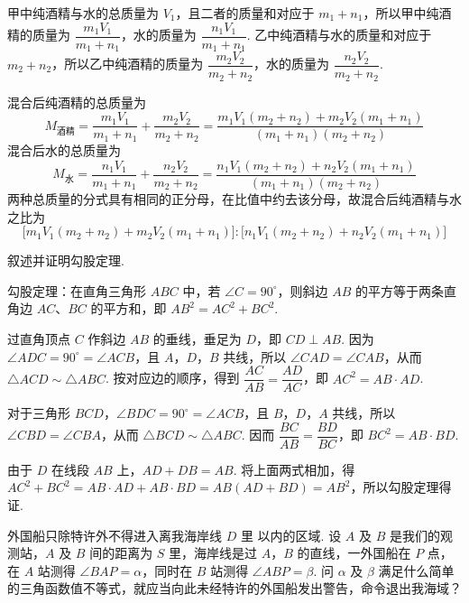\documentclass[UTF8,a4paper,oneside,11pt]{ctexbook}
\begin{document}
\begin{solution}
甲中纯酒精与水的总质量为 \(V_{1}\)，且二者的质量和对应于 \(m_{1}+n_{1}\)，所以甲中纯酒精的质量为 \(\dfrac{m_{1}V_{1}}{m_{1}+n_{1}}\)，水的质量为 \(\dfrac{n_{1}V_{1}}{m_{1}+n_{1}}\). 乙中纯酒精与水的质量和对应于 \(m_{2}+n_{2}\)，所以乙中纯酒精的质量为 \(\dfrac{m_{2}V_{2}}{m_{2}+n_{2}}\)，水的质量为 \(\dfrac{n_{2}V_{2}}{m_{2}+n_{2}}\).

混合后纯酒精的总质量为
\[
M_{\text{酒精}}=\frac{m_{1}V_{1}}{m_{1}+n_{1}}+\frac{m_{2}V_{2}}{m_{2}+n_{2}}=\frac{m_{1}V_{1}(m_{2}+n_{2})+m_{2}V_{2}(m_{1}+n_{1})}{(m_{1}+n_{1})(m_{2}+n_{2})}
\]
混合后水的总质量为
\[
M_{\text{水}}=\frac{n_{1}V_{1}}{m_{1}+n_{1}}+\frac{n_{2}V_{2}}{m_{2}+n_{2}}=\frac{n_{1}V_{1}(m_{2}+n_{2})+n_{2}V_{2}(m_{1}+n_{1})}{(m_{1}+n_{1})(m_{2}+n_{2})}
\]
两种总质量的分式具有相同的正分母，在比值中约去该分母，故混合后纯酒精与水之比为
\[
\bigl[m_{1}V_{1}(m_{2}+n_{2})+m_{2}V_{2}(m_{1}+n_{1})\bigr]:\bigl[n_{1}V_{1}(m_{2}+n_{2})+n_{2}V_{2}(m_{1}+n_{1})\bigr]
\]
\end{solution}

\begin{problem}
叙述并证明勾股定理.
\end{problem}

\begin{solution}
勾股定理：在直角三角形 \(ABC\) 中，若 \(\angle C=90^\circ\)，则斜边 \(AB\) 的平方等于两条直角边 \(AC\)、\(BC\) 的平方和，即 \(AB^2=AC^2+BC^2\).

过直角顶点 \(C\) 作斜边 \(AB\) 的垂线，垂足为 \(D\)，即 \(CD\perp AB\). 因为 \(\angle ADC=90^\circ=\angle ACB\)，且 \(A\)，\(D\)，\(B\) 共线，所以 \(\angle CAD=\angle CAB\)，从而 \(\triangle ACD\sim\triangle ABC\). 按对应边的顺序，得到 \(\dfrac{AC}{AB}=\dfrac{AD}{AC}\)，即 \(AC^2=AB\cdot AD\).

对于三角形 \(BCD\)，\(\angle BDC=90^\circ=\angle ACB\)，且 \(B\)，\(D\)，\(A\) 共线，所以 \(\angle CBD=\angle CBA\)，从而 \(\triangle BCD\sim\triangle ABC\). 因而 \(\dfrac{BC}{AB}=\dfrac{BD}{BC}\)，即 \(BC^2=AB\cdot BD\).

由于 \(D\) 在线段 \(AB\) 上，\(AD+DB=AB\). 将上面两式相加，得 \(AC^2+BC^2=AB\cdot AD+AB\cdot BD=AB(AD+BD)=AB^2\)，所以勾股定理得证.
\end{solution}

\begin{problem}
外国船只除特许外不得进入离我海岸线 \(D\text{ 里}\) 以内的区域. 设 \(A\) 及 \(B\) 是我们的观测站，\(A\) 及 \(B\) 间的距离为 \(S\text{ 里}\)，海岸线是过 \(A\)，\(B\) 的直线，一外国船在 \(P\) 点，在 \(A\) 站测得 \(\angle BAP = \alpha\)，同时在 \(B\) 站测得 \(\angle ABP = \beta\). 问 \(\alpha\) 及 \(\beta\) 满足什么简单的三角函数值不等式，就应当向此未经特许的外国船发出警告，命令退出我海域？
\end{problem}
\end{document}

